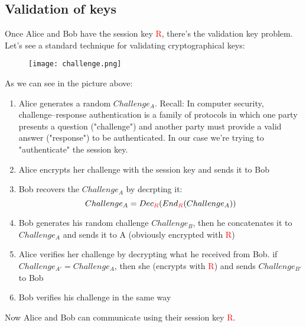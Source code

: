 \documentclass{article}
\begin{document}
\subsection{Validation of keys}
Once Alice and Bob have the session key \textcolor{red}{R}, there's the validation key problem. Let's see a standard technique for validating cryptographical keys:
\begin{figure} [H]
    \centering
    \texttt{[image: challenge.png]}
\end{figure}
As we can see in the picture above:
\begin{enumerate}
\item Alice generates a random $Challenge_A$. Recall: In computer security, challenge–response authentication is a family of protocols in which one party presents a question ("challenge") and another party must provide a valid answer ("response") to be authenticated. In our case we're trying to "authenticate" the session key. 
\item Alice encrypts her challenge with the session key and sends it to Bob
\item Bob recovers the $Challenge_A$ by decrpting it: 
\begin{equation*}
    Challenge_A = Dec_{\textcolor{red}{R}}(End_{\textcolor{red}{R}}(Challenge_A))
\end{equation*}
\item Bob generates his random challenge $Challenge_B$, then he concatenates it to $Challenge_A$ and sends it to A (obviously encrypted with \textcolor{red}{R})
\item Alice verifies her challenge by decrypting what he received from Bob. if $Challenge_{A'} = Challenge_A$, then she (encrypts with \textcolor{red}{R}) and sends $Challenge_{B'}$ to Bob
\item Bob verifies his challenge in the same way
\end{enumerate}
Now Alice and Bob can communicate using their session key \textcolor{red}{R}.
\end{document}
